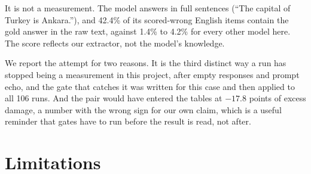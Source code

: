 \documentclass[final]{clv2025}
\begin{document}
It is not a measurement. The model answers in full sentences (``The capital of
Turkey is Ankara.''), and 42.4\% of its scored-wrong English items contain the
gold answer in the raw text, against 1.4\% to 4.2\% for every other model here.
The score reflects our extractor, not the model's knowledge.

We report the attempt for two reasons. It is the third distinct way a run has
stopped being a measurement in this project, after empty responses and prompt
echo, and the gate that catches it was written for this case and then applied
to all 106 runs. And the pair would have entered the tables at $-17.8$ points
of excess damage, a number with the wrong sign for our own claim, which is a
useful reminder that gates have to run before the result is read, not after.

\section{Limitations}
\end{document}

